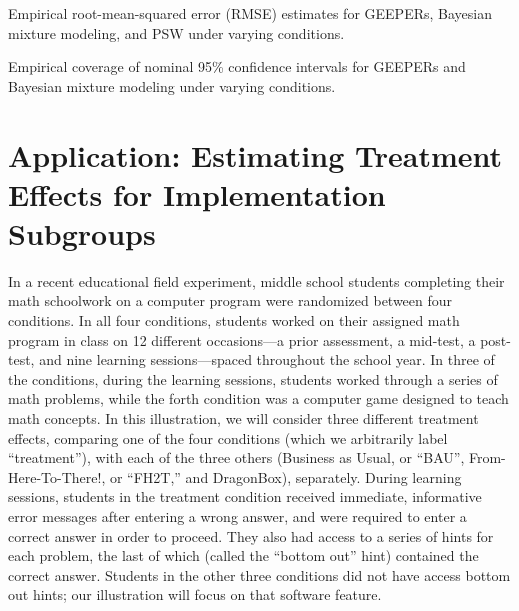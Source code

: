 \documentclass[11pt]{article} %
\begin{document}
  \begin{table}
    \centering
  
  \caption{Empirical root-mean-squared error (RMSE) estimates for GEEPERs, Bayesian mixture modeling, and PSW under varying conditions.}
  \label{tab:rmse}
\end{table}

\begin{table}
\centering
  
  \caption{Empirical coverage of nominal 95\% confidence intervals for GEEPERs and Bayesian mixture modeling under varying conditions.}
  \label{tab:coverage}
\end{table}


\section{Application: Estimating Treatment Effects for Implementation Subgroups}\label{sec:fh2t}

In a recent educational field experiment, middle school students completing their math schoolwork on a computer program were randomized between four conditions. In all four conditions, students worked on their assigned math program in class on 12 different occasions---a prior assessment, a mid-test, a post-test, and nine learning sessions---spaced throughout the school year.  In three of the conditions, during the learning sessions, students worked through a series of math problems, while the forth condition was a computer game designed to teach math concepts. In this illustration, we will consider three different treatment effects, comparing one of the four conditions (which we arbitrarily label ``treatment''), with each of the three others (Business as Usual, or ``BAU'', From-Here-To-There!, or ``FH2T,'' and DragonBox), separately. During learning sessions, students in the treatment condition received immediate, informative error messages after entering a wrong answer, and were required to enter a correct answer in order to proceed. They also had access to a series of hints for each problem, the last of which (called the ``bottom out'' hint) contained the correct answer. Students in the other three conditions did not have access bottom out hints; our illustration will focus on that software feature.
\end{document}
